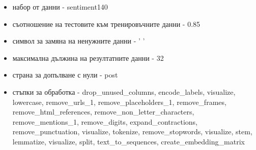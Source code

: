 \documentclass{article}
\begin{document}
\begin{itemize}
  \begin{itemize}
    \item набор от данни - sentiment140
    \item съотношение на тестовите към тренировъчните данни - 0.85
    \item символ за замяна на ненужните данни - ' '
    \item максимална дължина на резултатните данни - 32
    \item страна за допълване с нули - post
    \item стъпки за обработка - drop\_unused\_columns, encode\_labels, visualize, lowercase, remove\_urls\_1,
    remove\_placeholders\_1, remove\_frames, remove\_html\_references, remove\_non\_letter\_characters,
    remove\_mentions\_1, remove\_digits, expand\_contractions, remove\_punctuation, visualize, tokenize,
    remove\_stopwords, visualize, stem, lemmatize, visualize, split, text\_to\_sequences, create\_embedding\_matrix
  \end{itemize}


\end{itemize}
\end{document}
